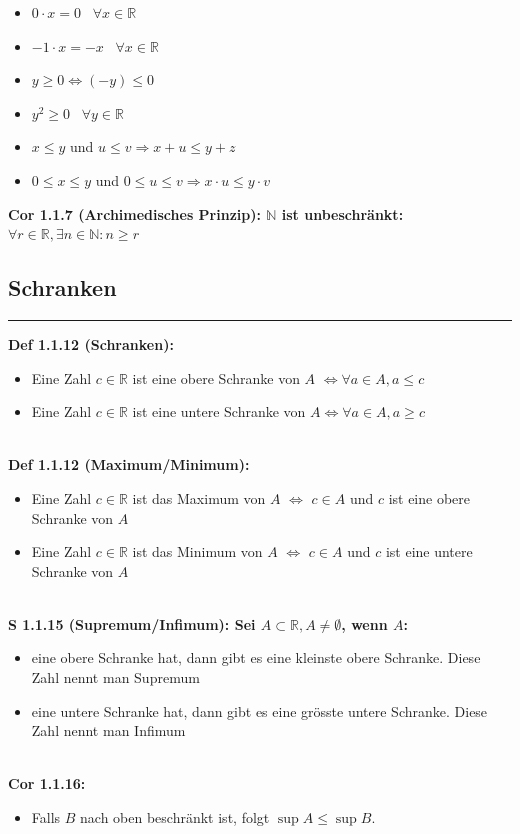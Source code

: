 \documentclass[7pt,landscape, margin = 0.1mm]{article}
\newcommand*{\mysubsection}[1]{\vspace{-2mm}\color{chaptercolor}\subsection{ #1 }
\vspace{-1mm}\hrule\vspace{1.5mm}\color{black}
\vspace{2mm}}
\newcommand{\DEF}[2]{\color{chaptercolor}\bf{Def #1}:\color{black}    \hspace{0.2cm} #2 \\}
\newcommand{\COR}[2]{\color{chaptercolor}\bf{Cor #1}:\color{black}    \hspace{0.2cm} #2 \\}
\newcommand{\SA}[2]{\color{chaptercolor}\bf{S #1}:\color{black}    \hspace{0.2cm} #2 \\}
\begin{document}
\begin{multicols}{4}
\begin{flushleft}
{\begin{itemize}
\item[2.]$0 \cdot x = 0 \; \; \; \forall x \in \mathbb{R}$
\item[3.] $-1 \cdot x = -x \; \; \; \forall x \in \mathbb{R}$
\item[4.] $y \geq 0 \Leftrightarrow (-y) \leq 0$
\item[5.] $y^2 \geq 0 \; \; \; \forall y \in \mathbb{R}$
\item[6.] $x \leq y$ und $u\leq v \Rightarrow x+u \leq y+z$
\item[7.] $0 \leq x \leq y$ und $0 \leq u \leq v \Rightarrow x \cdot u \leq y \cdot v$
\end{itemize}
}
\COR{1.1.7 (Archimedisches Prinzip)}{$\mathbb{N}$ ist unbeschränkt: $\forall r \in \mathbb{R} , \exists n \in \mathbb{N}: n \geq r$}
\mysubsection{Schranken}
\DEF{1.1.12 (Schranken)}{
\begin{itemize}
\item Eine Zahl $c \in \mathbb{R}$ ist eine obere Schranke von $A$ $\Leftrightarrow \forall a \in A, a\leq c$
 \item Eine Zahl $c \in \mathbb{R}$ ist eine untere Schranke von $A \Leftrightarrow \forall a \in A, a\geq c$
\end{itemize}}
\DEF{1.1.12 (Maximum/Minimum)}{
\begin{itemize}
\item[\tiny$\max(A)$\scriptsize] Eine Zahl $c \in \mathbb{R}$ ist das Maximum von $A$ $\Leftrightarrow$ $c \in A$ und $c$ ist eine obere Schranke von $A$
\item[\tiny$\min(A)$\scriptsize] Eine Zahl $c \in \mathbb{R}$ ist das Minimum von $A$ $\Leftrightarrow$ $c \in A$ und $c$ ist eine untere Schranke von $A$
\end{itemize}}
\SA{1.1.15 (Supremum/Infimum)}{
Sei $A \subset \mathbb{R}, A \neq \emptyset$, wenn $A$:
\begin{itemize}
\item[\tiny$\sup(A)$\scriptsize] eine obere Schranke hat, dann gibt es eine kleinste obere Schranke. Diese Zahl nennt man Supremum
\end{itemize} 
\begin{itemize}
\item[\tiny$\inf(A)$\scriptsize] eine untere Schranke hat, dann gibt es eine grösste untere Schranke. Diese Zahl nennt man Infimum
\end{itemize}}
\COR{1.1.16}{
\begin{itemize}
\item[(i)]Falls $B$ nach oben beschränkt ist, folgt $\sup A \leqslant \sup B$.

\end{itemize}}
\end{flushleft}
\end{multicols}
\end{document}
